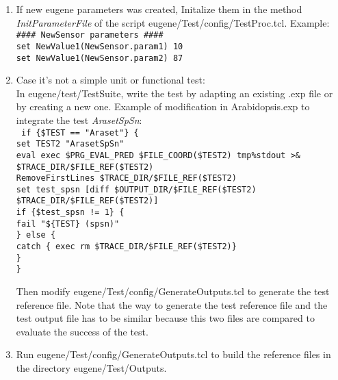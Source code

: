 \documentclass[a4paper,11pt]{article}
\begin{document}
\begin{enumerate}
\begin{itemize}
\end{itemize}
\item If new eugene parameters was created, Initalize them in the method  \textit{InitParameterFile} of the script eugene/Test/config/TestProc.tcl. Example:\\
{\tt \small \#\#\#\# NewSensor parameters \#\#\#\# \\
set NewValue1(NewSensor.param1)  10\\
set NewValue1(NewSensor.param2)  87 }
\item Case it's not a simple unit or functional test:\\
In eugene/test/TestSuite, write the test by adapting an existing .exp file or by creating a new one. Example  of modification in Arabidopsis.exp to integrate the test \textit{ArasetSpSn}:\\
{\tt \small
   if \{\$TEST == "Araset"\} \{ \\
       set TEST2 "ArasetSpSn" \\
       eval exec \$PRG\_EVAL\_PRED \$FILE\_COORD(\$TEST2) tmp\%stdout >\& \\ 
	\$TRACE\_DIR/\$FILE\_REF(\$TEST2) \\
       RemoveFirstLines \$TRACE\_DIR/\$FILE\_REF(\$TEST2) \\
       set test\_spsn [diff \$OUTPUT\_DIR/\$FILE\_REF(\$TEST2) \\
	\$TRACE\_DIR/\$FILE\_REF(\$TEST2)]\\
       if \{\$test\_spsn != 1\} \{ \\
           fail "\$\{TEST\} (spsn)" \\
          \} else \{ \\
           catch \{ exec rm \$TRACE\_DIR/\$FILE\_REF(\$TEST2)\}\\
       \}\\
   \} 	
}

Then modify eugene/Test/config/GenerateOutputs.tcl to generate the test reference file. 
Note that the way to generate the test reference file and the test output file has to be similar
because this two files are compared to evaluate the success of the test.
\item Run eugene/Test/config/GenerateOutputs.tcl to build the reference files in the directory eugene/Test/Outputs.
\end{enumerate}
\end{document}
